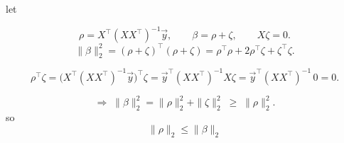 \begin{answer}
let

$$
\rho=X^{\top}(XX^{\top})^{-1}\vec y,
\qquad
\beta=\rho+\zeta,
\qquad
X\zeta=0 .
$$
$$
\|\beta\|_{2}^{2}
=(\rho+\zeta)^{\!\top}(\rho+\zeta)
=\rho^{\top}\rho+2\rho^{\top}\zeta+\zeta^{\top}\zeta .
$$

$$
\rho^{\top}\zeta
=\bigl(X^{\top}(XX^{\top})^{-1}\vec y\bigr)^{\!\top}\zeta
=\vec y^{\top}(XX^{\top})^{-1}X\zeta
=\vec y^{\top}(XX^{\top})^{-1}\,0
=0 .
$$

$$
\Longrightarrow\;
\|\beta\|_{2}^{2}
=\|\rho\|_{2}^{2}+\|\zeta\|_{2}^{2}
\;\ge\;\|\rho\|_{2}^{2}.
$$
so
$$
\boxed{\;\|\rho\|_{2}\le\|\beta\|_{2}\;}
$$
\end{answer}